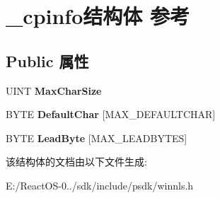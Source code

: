 \hypertarget{struct__cpinfo}{}\section{\+\_\+cpinfo结构体 参考}
\label{struct__cpinfo}
\subsection*{Public 属性}
\begin{DoxyCompactItemize}
\item 
\mbox{\label{struct__cpinfo_a9e4140ecd7633d68167e3e44491caab9}} 
U\+I\+NT {\bfseries Max\+Char\+Size}
\item 
\mbox{\label{struct__cpinfo_a51461ec08d192e4f97fc5baa66eabbcd}} 
B\+Y\+TE {\bfseries Default\+Char} \mbox{[}M\+A\+X\+\_\+\+D\+E\+F\+A\+U\+L\+T\+C\+H\+AR\mbox{]}
\item 
\mbox{\label{struct__cpinfo_a2d0d9267b20738a7cc24eb844f3d8d5c}} 
B\+Y\+TE {\bfseries Lead\+Byte} \mbox{[}M\+A\+X\+\_\+\+L\+E\+A\+D\+B\+Y\+T\+ES\mbox{]}
\end{DoxyCompactItemize}


该结构体的文档由以下文件生成\+:\begin{DoxyCompactItemize}
\item 
E\+:/\+React\+O\+S-\/0../sdk/include/psdk/winnls.\+h\end{DoxyCompactItemize}
